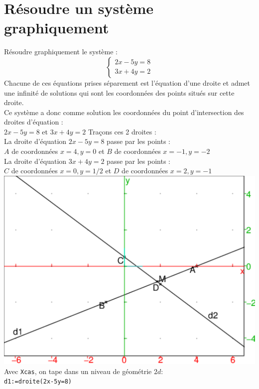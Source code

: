 \documentclass[a4paper,11pt]{book}
\begin{document}
\section{R\'esoudre un syst\`eme graphiquement}
R\'esoudre graphiquement le syst\`eme :\\
$$\left\{
\begin{array}{l}
2x-5y=8\\
3x+4y=2
\end{array}
\right.
$$
Chacune de ces \'equations prises s\'eparement est l'\'equation d'une droite et admet une infinit\'e de solutions qui sont les coordonn\'ees des points 
situ\'es sur cette droite.\\
Ce syst\`eme a donc comme solution les coordonn\'ees du point d'intersection
des droites d'\'equation :\\ 
$2x-5y=8$ et $3x+4y=2$
Tra\c{c}ons ces 2 droites :\\
La droite d'\'equation $2x-5y=8$ passe par les points :\\
$A$  de coordonn\'ees $x=4,y=0$ et $B$  de coordonn\'ees $x=-1,y=-2$\\
La droite d'\'equation $3x+4y=2$ passe par les points  :\\
$C$ de coordonn\'ees $x=0,y=1/2$ et $D$  de coordonn\'ees $x=2,y=-1$\\
\includegraphics[width=\textwidth]{systgraph}\\
Avec {\tt Xcas}, on tape dans un niveau de g\'eom\'etrie $2d$:\\
{\tt d1:=droite(2x-5y=8)}\\
\end{document}
